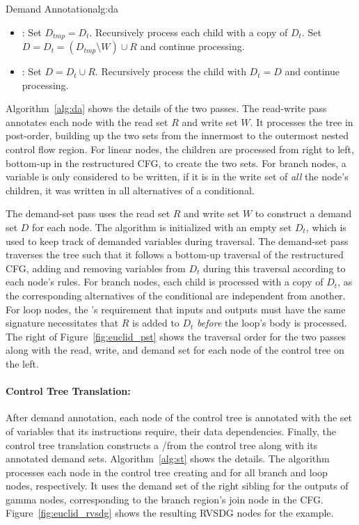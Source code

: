 \begin{informalg}{Demand Annotation}{alg:da}
\begin{enumerate}
\begin{itemize}
			\item {}: Set $D_{tmp} = D_t$. Recursively process each child with a copy
				of $D_t$. Set $D = D_t = (D_{tmp} \setminus W) \cup R$ and continue processing.

			\item {}: Set $D = D_t \cup R$. Recursively process the child with
				$D_t = D$ and continue processing.
		\end{itemize}

	\vspace*{-\baselineskip}
\end{enumerate}
\end{informalg}

Algorithm~\ref{alg:da} shows the details of the two passes. The read-write pass annotates each node
with the read set $R$ and write set $W$. It processes the tree in post-order, building up
the two sets from the innermost to the outermost nested control flow region. For linear nodes, the
children are processed from right to left, \ie bottom-up in the restructured CFG, to create the
two sets. For branch nodes, a variable is only considered to be written, if it is in the write
set of \emph{all} the node's children, \ie it was written in all alternatives of a conditional.

The demand-set pass uses the read set $R$ and write set $W$ to construct a demand set $D$ for each
node. The algorithm is initialized with an empty set $D_t$, which is used to keep track of
demanded variables during traversal. The demand-set pass traverses the tree such that it follows
a bottom-up traversal of the restructured CFG, adding and removing variables from $D_t$ during
this traversal according to each node's rules. For branch nodes, each child is processed with a copy of
$D_t$, as the corresponding alternatives of the conditional are independent from another. For loop
nodes, the \thetanode's requirement that inputs and outputs must have the same signature
necessitates that $R$ is added to $D_t$ \emph{before} the loop's body is processed.
The right of Figure~\ref{fig:euclid_pst} shows the traversal order for the two passes along with
the read, write, and demand set for each node of the control tree on the left.

\paragraph{Control Tree Translation:}
After demand annotation, each node of the control tree is annotated with the set of variables that
its instructions require, \ie their data dependencies. Finally, the control tree translation
constructs a \deltam/\lambdaregion from the control tree along with its annotated demand sets.
Algorithm~\ref{alg:st} shows the details. The algorithm processes each node in the control tree
creating \gammam and \thetanodes for all branch and loop nodes, respectively.
It uses the demand set of the right sibling for the outputs of gamma nodes,
corresponding to the branch region's join node in the CFG.
Figure~\ref{fig:euclid_rvsdg} shows the resulting RVSDG nodes for the example.

